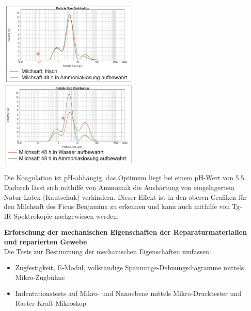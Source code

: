\begin{center}
    \includegraphics[width=7cm]{lec5/figures/partikel-frisch.png}
    \includegraphics[width=7cm]{lec5/figures/partikel-wasser.png}
\end{center}
Die Koagulation ist pH-abhängig, das Optimum liegt bei einem pH-Wert von 5.5. Dadurch lässt sich mithilfe von Ammoniak die Aushärtung von eingelagertem Natur-Latex (Kautschuk) verhindern. Dieser Effekt ist in den oberen Grafiken für den Milchsaft des Ficus Benjamina zu erkennen und kann auch mithilfe von Tg-IR-Spektrokopie nachgewiesen werden.

\vspace*{2\baselineskip}

\textbf{Erforschung der mechanischen Eigenschaften der Reparaturmaterialien und reparierten Gewebe}\\

Die Tests zur Bestimmung der mechanischen Eigenschaften umfassen:

\begin{itemize}
    \item Zugfestigkeit, E-Modul, vollständige Spannungs-Dehnungsdiagramme mittels Mikro-Zugbühne
    \item Indentationstests auf Mikro- und Nanoebene mittels Mikro-Drucktester und Raster-Kraft-Mikroskop 
\end{itemize}

